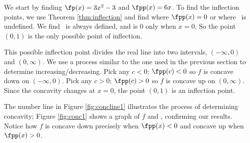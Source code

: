 
{We start by finding $\fp(x)=3x^2-3$ and $\fpp(x)=6x$.  To find the inflection points, we use Theorem \ref{thm:inflection} and find where $\fpp(x)=0$ or where \fpp\ is undefined. We find \fpp\ is always defined, and is 0 only when $x=0$. So the point $(0,1)$ is the only possible point of inflection.

This possible inflection point divides the real line into two intervals, $(-\infty,0)$ and $(0,\infty)$. We use a process similar to the one used in the previous section to determine increasing/decreasing. Pick any $c<0$; $\fpp(c)<0$ so $f$ is concave down on $(-\infty,0)$. Pick any $c>0$; $\fpp(c)>0$ so $f$ is concave up on $(0,\infty)$. Since the concavity changes at $x=0$, the point $(0,1)$ is an inflection point.

The number line in Figure \ref{fig:concline1} illustrates the process of determining concavity; Figure \ref{fig:conc1} shows a graph of $f$ and \fpp, confirming our results. Notice how $f$ is concave down precisely when $\fpp(x)<0$ and concave up when $\fpp(x)>0$.



}\\


